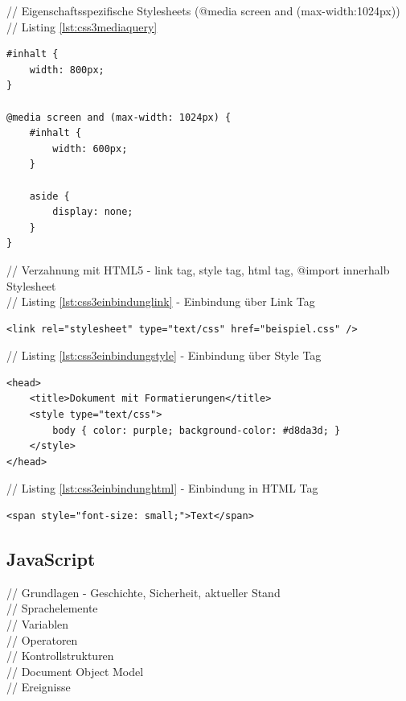\documentclass[12pt,a4paper,bibliography=totocnumbered,listof=totocnumbered]{scrartcl}
\begin{document}
// Eigenschaftsspezifische Stylesheets (@media screen and (max-width:1024px))\\
// Listing \ref{lst:css3mediaquery}
	\vspace{1em}
	\begin{lstlisting}[caption=CSS3 eigenschaftsspezifisches Stylesheet, label=lst:css3mediaquery]
#inhalt {
	width: 800px;
}
 
@media screen and (max-width: 1024px) {
	#inhalt {
		width: 600px;
	}
 
	aside {
		display: none;
	}
}
	\end{lstlisting}
	
// Verzahnung mit HTML5 - link tag, style tag, html tag, @import innerhalb Stylesheet\\
// Listing \ref{lst:css3einbindunglink} - Einbindung über Link Tag
	\vspace{1em}
	\begin{lstlisting}[caption=Stylesheet Einbindung über Link Tag, label=lst:css3einbindunglink]
<link rel="stylesheet" type="text/css" href="beispiel.css" />
	\end{lstlisting}
	
// Listing \ref{lst:css3einbindungstyle} - Einbindung über Style Tag
	\vspace{1em}
	\begin{lstlisting}[caption=Stylesheet Einbindung über Style Tag, label=lst:css3einbindungstyle]
<head>
	<title>Dokument mit Formatierungen</title>
	<style type="text/css">
		body { color: purple; background-color: #d8da3d; }
	</style>
</head>
	\end{lstlisting}
	
// Listing \ref{lst:css3einbindunghtml} - Einbindung in HTML Tag
	\vspace{1em}
	\begin{lstlisting}[caption=Stylesheet Einbindung in HTML Tag, label=lst:css3einbindunghtml]
<span style="font-size: small;">Text</span>
	\end{lstlisting}

\subsection{JavaScript}
// Grundlagen - Geschichte, Sicherheit, aktueller Stand\\
// Sprachelemente\\
// Variablen\\
// Operatoren\\
// Kontrollstrukturen\\
// Document Object Model\\
// Ereignisse\\
\end{document}
